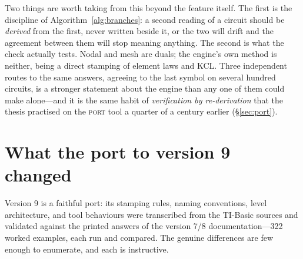 \documentclass[11pt,oneside]{report}
\newcommand{\kw}[1]{\textsc{#1}}
\begin{document}
Two things are worth taking from this beyond the feature itself. The
first is the discipline of Algorithm~\ref{alg:branches}: a second
reading of a circuit should be \emph{derived} from the first, never
written beside it, or the two will drift and the agreement between
them will stop meaning anything. The second is what the check actually
tests. Nodal and mesh are duals; the engine's own method is neither,
being a direct stamping of element laws and KCL. Three independent
routes to the same answers, agreeing to the last symbol on several
hundred circuits, is a stronger statement about the engine than any
one of them could make alone---and it is the same habit of
\emph{verification by re-derivation} that the thesis practised on the
\kw{port} tool a quarter of a century earlier (\S\ref{sec:port}).

\section{What the port to version 9 changed}
\label{sec:portchanges}

Version 9 is a faithful port: its stamping rules, naming conventions,
level architecture, and tool behaviours were transcribed from the
TI-Basic sources and validated against the printed answers of the
version 7/8 documentation---322 worked examples, each run and
compared. The genuine differences are few enough to enumerate, and
each is instructive.
\end{document}
